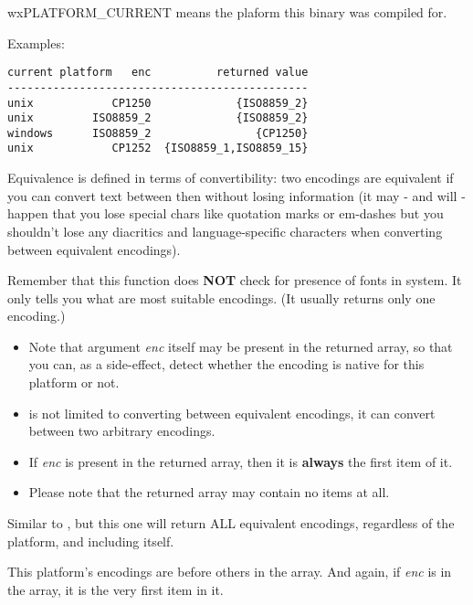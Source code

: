 wxPLATFORM\_CURRENT means the plaform this binary was compiled for.

Examples:

\begin{verbatim}
current platform   enc          returned value
----------------------------------------------
unix            CP1250             {ISO8859_2}
unix         ISO8859_2             {ISO8859_2}
windows      ISO8859_2                {CP1250}
unix            CP1252  {ISO8859_1,ISO8859_15}
\end{verbatim}

Equivalence is defined in terms of convertibility:
two encodings are equivalent if you can convert text between
then without losing information (it may - and will - happen
that you lose special chars like quotation marks or em-dashes
but you shouldn't lose any diacritics and language-specific
characters when converting between equivalent encodings).

Remember that this function does {\bf NOT} check for presence of
fonts in system. It only tells you what are most suitable
encodings. (It usually returns only one encoding.)


\begin{itemize}\itemsep=0pt
\item Note that argument {\it enc} itself may be present in the returned array,
so that you can, as a side-effect, detect whether the
encoding is native for this platform or not.
\item {} is not limited to 
converting between equivalent encodings, it can convert between two arbitrary
encodings.
\item If {\it enc} is present in the returned array, then it is {\bf always} the first
item of it.
\item Please note that the returned array may contain no items at all.
\end{itemize}

\label{wxencodingconvertergetallequivalents}


Similar to 
, 
but this one will return ALL 
equivalent encodings, regardless of the platform, and including itself.

This platform's encodings are before others in the array. And again, if {\it enc} is in the array,
it is the very first item in it.

